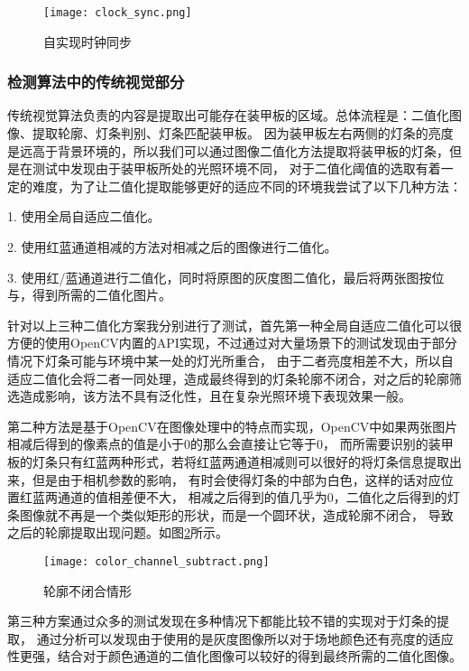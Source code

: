 \begin{figure}[H]
    \centering
    \texttt{[image: clock\_sync.png]} 
    \caption{自实现时钟同步} 
    \label{clock_sync}
\end{figure}

\subsubsection{检测算法中的传统视觉部分}
传统视觉算法负责的内容是提取出可能存在装甲板的区域。总体流程是：二值化图像、提取轮廓、灯条判别、灯条匹配装甲板。
因为装甲板左右两侧的灯条的亮度是远高于背景环境的，所以我们可以通过图像二值化方法提取将装甲板的灯条，但是在测试中发现由于装甲板所处的光照环境不同，
对于二值化阈值的选取有着一定的难度，为了让二值化提取能够更好的适应不同的环境我尝试了以下几种方法：\par
1. 使用全局自适应二值化。\par
2. 使用红蓝通道相减的方法对相减之后的图像进行二值化。\par
3. 使用红/蓝通道进行二值化，同时将原图的灰度图二值化，最后将两张图按位与，得到所需的二值化图片。\par

针对以上三种二值化方案我分别进行了测试，首先第一种全局自适应二值化可以很方便的使用OpenCV\cite{bradski2000opencv}内置的API实现，不过通过对大量场景下的测试发现由于部分情况下灯条可能与环境中某一处的灯光所重合，
由于二者亮度相差不大，所以自适应二值化会将二者一同处理，造成最终得到的灯条轮廓不闭合，对之后的轮廓筛选造成影响，该方法不具有泛化性，且在复杂光照环境下表现效果一般。\par

第二种方法是基于OpenCV在图像处理中的特点而实现，OpenCV中如果两张图片相减后得到的像素点的值是小于0的那么会直接让它等于0，
而所需要识别的装甲板的灯条只有红蓝两种形式，若将红蓝两通道相减则可以很好的将灯条信息提取出来，但是由于相机参数的影响，
有时会使得灯条的中部为白色，这样的话对应位置红蓝两通道的值相差便不大，
相减之后得到的值几乎为0，二值化之后得到的灯条图像就不再是一个类似矩形的形状，而是一个圆环状，造成轮廓不闭合，
导致之后的轮廓提取出现问题。如图\ref{轮廓不闭合情形}所示。\par
\begin{figure}[H]
    \centering
    \texttt{[image: color\_channel\_subtract.png]} 
    \caption{轮廓不闭合情形} 
    \label{轮廓不闭合情形}
\end{figure}


第三种方案通过众多的测试发现在多种情况下都能比较不错的实现对于灯条的提取，
通过分析可以发现由于使用的是灰度图像所以对于场地颜色还有亮度的适应性更强，结合对于颜色通道的二值化图像可以较好的得到最终所需的二值化图像。\par


